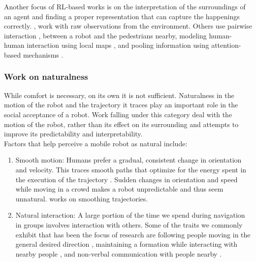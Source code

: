 Another focus of RL-based works is on the interpretation of the surroundings of an agent and finding a proper representation that can capture the happenings correctly. \cite{long_2017_optimally_decentralized_collision_avoidance, tai_paolo_virtual_to_real_2017}, work with raw observations from the environment. Others use pairwise interaction \cite{chen_crowd_aware_robot_nav_with_attention}, \cite{chen_decentralized_non_communication_2017} between a robot and the pedestrians nearby, modeling human-human interaction using local maps \cite{chen_crowd_aware_robot_nav_with_attention}, and pooling information using attention-based mechanisms \cite{chen_crowd_aware_robot_nav_with_attention}.

\subsubsection{Work on naturalness}
While comfort is necessary, on its own it is not sufficient. Naturalness in the motion of the robot and the trajectory it traces play an important role in the social acceptance of a robot. Work falling under this category deal with the motion of the robot, rather than its effect on its surrounding and attempts to improve its predictability and interpretability.\\ %

Factors that help perceive a mobile robot as natural include:
\begin{enumerate}
    \item Smooth motion: Humans prefer a gradual, consistent change in orientation and velocity. This traces smooth paths that optimize for the energy spent in the execution of the trajectory \cite{arechavaleta_nonholonomic_2008}. Sudden changes in orientation and speed while moving in a crowd makes a robot unpredictable and thus seem unnatural. \cite{pandey_alami_robot_guide_2009, pandey_2010_human_centered_nav } works on smoothing trajectories.
    \item Natural interaction: A large portion of the time we spend during navigation in groups involves interaction with others. Some of the traits we commonly exhibit that has been the focus of research are following people moving in the general desired direction \cite{gockley_natual_person_following_2007}, maintaining a formation while interacting with nearby people \cite{althaus_nav_for_human_robot_interaction_2004}, and non-verbal communication with people nearby \cite{sauliner_minimal_nonverbal_interruption_2011}. 
    
\end{enumerate}

